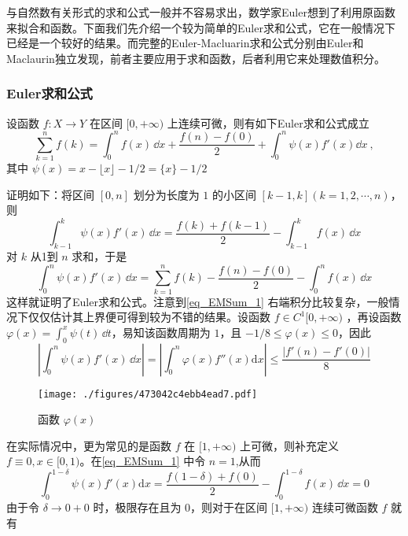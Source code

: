 
与自然数有关形式的求和公式一般并不容易求出，数学家Euler想到了利用原函数来拟合和函数。下面我们先介绍一个较为简单的Euler求和公式，它在一般情况下已经是一个较好的结果。而完整的Euler-Macluarin求和公式分别由Euler和Maclaurin独立发现，前者主要应用于求和函数，后者利用它来处理数值积分。

\subsubsection{Euler求和公式}

\begin{theorem}{}
设函数 $f:X\to Y$ 在区间 $[0,+\infty)$ 上连续可微，则有如下Euler求和公式成立	
        \begin{equation}\label{eq_EMSum_1} 
            \sum_{k=1}^{n}f(k)=\int_{0}^{n}f(x)\,\dd x
            +\frac{f(n)-f(0)}{2}+\int_{0}^{n}\psi(x)f'(x)\dd x~,
        \end{equation}
    其中 $\psi(x)=x-\lfloor x \rfloor-1/2=\{x\}-1/2$
\end{theorem}
证明如下：将区间 $[0,n]$ 划分为长度为 $1$ 的小区间 $[k-1,k](k=1,2,\cdots,n)$，则
​\[
    \int_{k-1}^{k}\psi(x)f'(x)\,\dd x
    =\frac{f(k)+f(k-1)}{2}-\int_{k-1}^{k}f(x)\,\dd x
\]
​对 $k$ 从1到 $n$ 求和，于是
​\[
    \int_{0}^{n}\psi(x)f'(x)\,\dd x
    =\sum_{k=1}^{n}f(k)-\frac{f(n)-f(0)}{2}-\int_{0}^{n}f(x)\,\dd x
\]
这样就证明了Euler求和公式。注意到\autoref{eq_EMSum_1}  右端积分比较复杂，一般情况下仅仅估计其上界便可得到较为不错的结果。设函数 $f\in{C^1[0,+\infty)}$ ，再设函数 $\varphi(x)=\displaystyle{\int_{0}^{x}\psi(t)\,\dd t}$，易知该函数周期为 $1$，且
 $-1/8\leqslant\varphi(x)\leqslant 0$，因此
\[
    \left|\int_{0}^{n}\psi(x)f'(x)\,\dd x\right|
    =\left|\int_{0}^{n}\varphi(x)f''(x)\mathrm{d}x\right|
    \leqslant\frac{|f'(n)-f'(0)|}{8}
\]
\begin{figure}[ht]
\centering
\texttt{[image: ./figures/473042c4ebb4ead7.pdf]}
\caption{函数 $\varphi(x)$} \label{fig_EMSum_1}
\end{figure}
在实际情况中，更为常见的是函数 $f$ 在 $[1,+\infty)$ 上可微，则补充定义 $ f\equiv 0,x\in[0,1)$。在\autoref{eq_EMSum_1}  中令 $n=1$,从而
\[
    \int_{0}^{1-\delta}\psi(x)f'(x)\mathrm{d}x
    =\frac{f(1-\delta)+f(0)}{2}-\int_{0}^{1-\delta}f(x)\,\dd x=0
\]
由于令 $\delta\to0+0$ 时，极限存在且为 $0$，则对于在区间 $[1,+\infty)$ 连续可微函数 $f$ 就有
